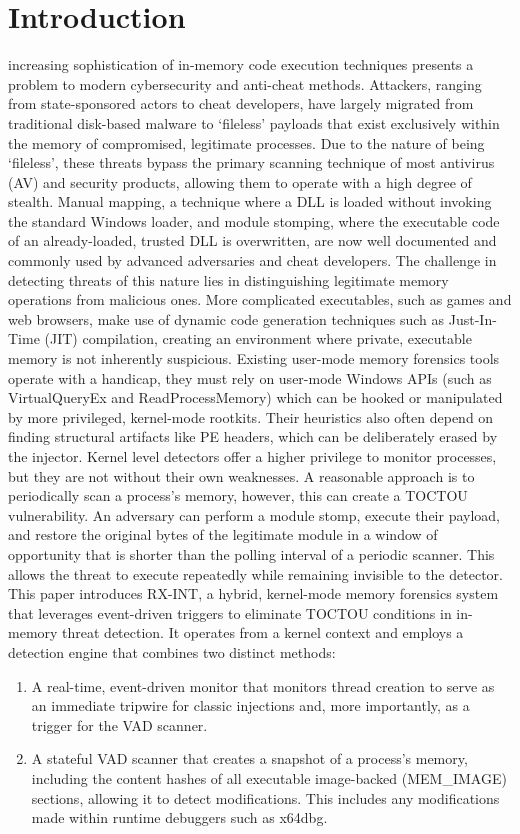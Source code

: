 \documentclass[journal]{IEEEtran}
\begin{document}
\section{Introduction}
 increasing sophistication of in-memory code execution techniques presents a problem to modern cybersecurity and anti-cheat methods. Attackers, ranging from state-sponsored actors to cheat developers, have largely migrated from traditional disk-based malware to `fileless' payloads that exist exclusively within the memory of compromised, legitimate processes. Due to the nature of being `fileless', these threats bypass the primary scanning technique of most antivirus (AV) and security products, allowing them to operate with a high degree of stealth. Manual mapping, a technique where a DLL is loaded without invoking the standard Windows loader, and module stomping, where the executable code of an already-loaded, trusted DLL is overwritten, are now well documented and commonly used by advanced adversaries and cheat developers.
The challenge in detecting threats of this nature lies in distinguishing legitimate memory operations from malicious ones. More complicated executables, such as games and web browsers, make use of dynamic code generation techniques such as Just-In-Time (JIT) compilation, creating an environment where private, executable memory is not inherently suspicious. Existing user-mode memory forensics tools operate with a handicap, they must rely on user-mode Windows APIs (such as VirtualQueryEx and ReadProcessMemory) which can be hooked or manipulated by more privileged, kernel-mode rootkits. Their heuristics also often depend on finding structural artifacts like PE headers, which can be deliberately erased by the injector.
Kernel level detectors offer a higher privilege to monitor processes, but they are not without their own weaknesses. A reasonable approach is to periodically scan a process's memory, however, this can create a TOCTOU vulnerability. An adversary can perform a module stomp, execute their payload, and restore the original bytes of the legitimate module in a window of opportunity that is shorter than the polling interval of a periodic scanner. This allows the threat to execute repeatedly while remaining invisible to the detector.
This paper introduces RX-INT, a hybrid, kernel-mode memory forensics system that leverages event-driven triggers to eliminate TOCTOU conditions in in-memory threat detection. It operates from a kernel context and employs a detection engine that combines two distinct methods:
\begin{enumerate}
\item A real-time, event-driven monitor that monitors thread creation to serve as an immediate tripwire for classic injections and, more importantly, as a trigger for the VAD scanner.
\item A stateful VAD scanner that creates a snapshot of a process's memory, including the content hashes of all executable image-backed (MEM\_IMAGE) sections, allowing it to detect modifications. This includes any modifications made within runtime debuggers such as x64dbg.
\end{enumerate}
\end{document}
